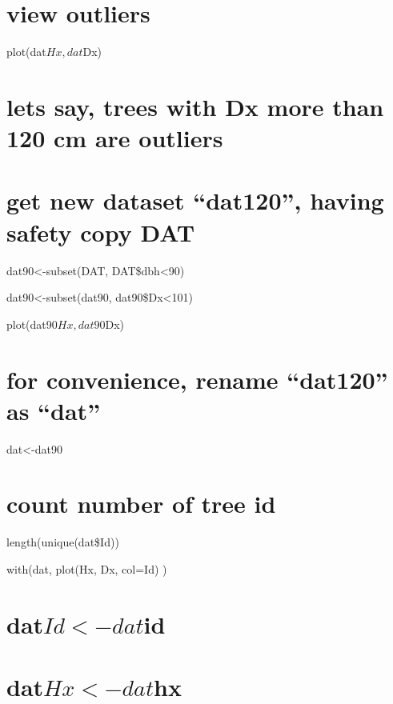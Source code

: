 \documentclass[
]{article}
\begin{document}
\hypertarget{view-outliers}{%
\section{view outliers}\label{view-outliers}}

plot(dat\(Hx, dat\)Dx)

\hypertarget{lets-say-trees-with-dx-more-than-120-cm-are-outliers}{%
\section{lets say, trees with Dx more than 120 cm are
outliers}\label{lets-say-trees-with-dx-more-than-120-cm-are-outliers}}

\hypertarget{get-new-dataset-dat120-having-safety-copy-dat}{%
\section{get new dataset ``dat120'', having safety copy
DAT}\label{get-new-dataset-dat120-having-safety-copy-dat}}

dat90\textless-subset(DAT, DAT\$dbh\textless90)

dat90\textless-subset(dat90, dat90\$Dx\textless101)

plot(dat90\(Hx, dat90\)Dx)

\hypertarget{for-convenience-rename-dat120-as-dat}{%
\section{for convenience, rename ``dat120'' as
``dat''}\label{for-convenience-rename-dat120-as-dat}}

dat\textless-dat90

\hypertarget{count-number-of-tree-id}{%
\section{count number of tree id}\label{count-number-of-tree-id}}

length(unique(dat\$Id))

with(dat, plot(Hx, Dx, col=Id) )

\hypertarget{datid-datid}{%
\section{\texorpdfstring{dat\(Id<-dat\)id}{datId\textless-datid}}\label{datid-datid}}

\hypertarget{dathx-dathx}{%
\section{\texorpdfstring{dat\(Hx<-dat\)hx}{datHx\textless-dathx}}\label{dathx-dathx}}
\end{document}
